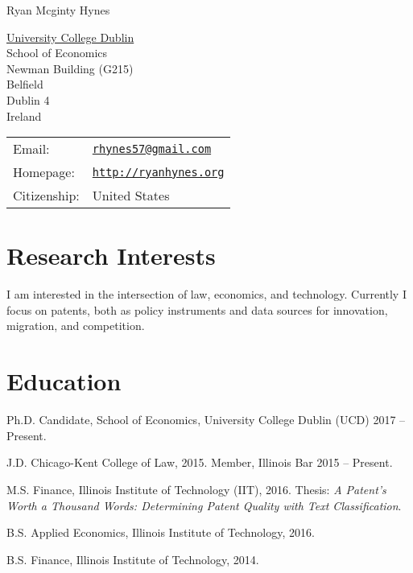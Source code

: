 \documentclass[letterpaper]{article}
\def\name{Ryan Mcginty Hynes}
\renewenvironment{itemize}{
  \begin{list}{}{
    \setlength{\leftmargin}{1.5em}
  }
}{
  \end{list}
}
\begin{document}
{\huge \name}


\vspace{0.25in}

\begin{minipage}{0.45\linewidth}
  \href{http://http://www.ucd.ie/economics/}{University College Dublin} \\
  School of Economics \\
 Newman Building (G215) \\
 Belfield\\
 Dublin 4\\
 Ireland\\
 
\end{minipage}
\begin{minipage}{0.45\linewidth}
  \begin{tabular}{ll}
    Email: & \href{mailto:rhynes57@gmail.com}{\tt rhynes57@gmail.com} \\
    Homepage: & \href{http://ryanhynes.org}{\tt http://ryanhynes.org} \\
    Citizenship: & United States \\
  \end{tabular}
\end{minipage}

\section*{Research Interests}
\begin{itemize}
\item I am interested in the intersection of law, economics, and technology. Currently I focus on patents, both as policy instruments and data sources for innovation, migration, and competition. 
\end{itemize} 

\section*{Education}

\begin{itemize}
  \item Ph.D. Candidate, School of Economics, University College Dublin (UCD) 2017 -- Present.
  \item J.D. Chicago-Kent College of Law, 2015.
  \subitem Member, Illinois Bar 2015 -- Present.
  \item M.S. Finance, Illinois Institute of Technology (IIT), 2016.
  	\subitem Thesis: \emph{A Patent's Worth a Thousand Words:
Determining Patent Quality with Text
Classification}.
  \item B.S. Applied Economics, Illinois Institute of Technology, 2016.
  \item B.S. Finance, Illinois Institute of Technology, 2014.
  

  
\end{itemize}
\end{document}
